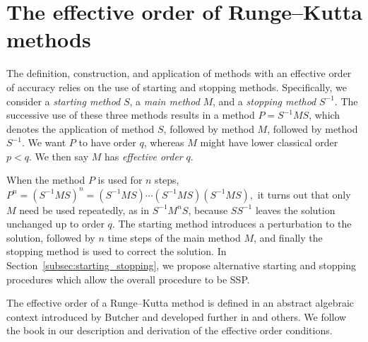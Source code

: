 \section{The effective order of Runge--Kutta methods}\label{sec:Algebraic_RK}

The definition, construction, and application of methods with an
effective order of accuracy relies on the use of starting and stopping
methods.
Specifically, we consider a \emph{starting method} $S$, a \emph{main
  method} $M$, and a \emph{stopping method} $S^{-1}$.
The successive use of these three methods results in a method $P =
S^{-1}MS$, which denotes the application of method $S$, followed by
method $M$, followed by method $S^{-1}$.
We want $P$ to have order $q$, whereas $M$ might have lower classical
order $p < q$.
We then say $M$ has \emph{effective order} $q$.

When the method $P$ is used for $n$ steps,
$P^n = (S^{-1}MS)^n = (S^{-1}MS) \cdots (S^{-1}MS) (S^{-1}MS),$
it turns out that only $M$ need be used repeatedly, as in
$S^{-1} M^n S$,
because %
$S S^{-1}$ leaves the solution unchanged up to order $q$.
The starting method introduces a perturbation to the solution,
followed by $n$ time steps of the main method $M$, and finally the
stopping method is used to correct the solution.
In Section~\ref{subsec:starting_stopping}, we propose alternative
starting and stopping procedures which allow the overall procedure to
be SSP.

The effective order of a Runge--Kutta method is defined in an abstract 
algebraic context introduced by Butcher \cite{Butcher1969} and developed 
further in \cite{Butcher1972, Hairer1974, Butcher1996, Butcher1998} and 
others.
We follow the book \cite{Butcher2008_book} in our description and
derivation of the effective order conditions.

